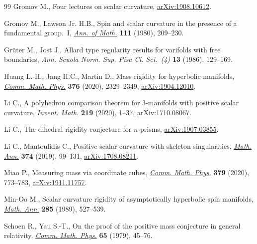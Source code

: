 \documentclass[10pt,a4paper]{amsart}
\numberwithin{equation}{section}
\theoremstyle{definition}
\begin{document}
\begin{thebibliography}{99}
Gromov M., Four lectures on scalar curvature, \href{https://arxiv.org/abs/1908.10612}{arXiv:1908.10612}.

Gromov M., Lawson Jr. H.B., Spin and scalar curvature in the presence of a
 fundamental group.~{I}, \href{https://doi.org/10.2307/1971198}{\textit{Ann. of Math.}} \textbf{111} (1980), 209--230.

Gr\"uter M., Jost J., Allard type regularity results for varifolds with free
 boundaries, \textit{Ann. Scuola Norm. Sup. Pisa Cl. Sci.~(4)} \textbf{13}
 (1986), 129--169.

Huang L.-H., Jang H.C., Martin D., Mass rigidity for hyperbolic manifolds,
 \href{https://doi.org/10.1007/s00220-019-03623-0}{\textit{Comm. Math. Phys.}} \textbf{376} (2020), 2329--2349,
 \href{https://arxiv.org/abs/1904.12010}{arXiv:1904.12010}.

Li C., A polyhedron comparison theorem for 3-manifolds with positive scalar
 curvature, \href{https://doi.org/10.1007/s00222-019-00895-0}{\textit{Invent. Math.}} \textbf{219} (2020), 1--37,
 \href{https://arxiv.org/abs/1710.08067}{arXiv:1710.08067}.

Li C., The dihedral rigidity conjecture for $n$-prisms, \href{https://arxiv.org/abs/1907.03855}{arXiv:1907.03855}.

Li C., Mantoulidis C., Positive scalar curvature with skeleton singularities,
 \href{https://doi.org/10.1007/s00208-018-1753-1}{\textit{Math. Ann.}} \textbf{374} (2019), 99--131, \href{https://arxiv.org/abs/1708.08211}{arXiv:1708.08211}.

Miao P., Measuring mass via coordinate cubes, \href{https://doi.org/10.1007/s00220-020-03811-3}{\textit{Comm. Math. Phys.}}
 \textbf{379} (2020), 773--783, \href{https://arxiv.org/abs/1911.11757}{arXiv:1911.11757}.

Min-Oo M., Scalar curvature rigidity of asymptotically hyperbolic spin
 manifolds, \href{https://doi.org/10.1007/BF01452046}{\textit{Math. Ann.}} \textbf{285} (1989), 527--539.

Schoen R., Yau S.-T., On the proof of the positive mass conjecture in general
 relativity, \href{https://doi.org/10.1007/BF01940959}{\textit{Comm. Math. Phys.}} \textbf{65} (1979), 45--76.


\end{thebibliography}
\end{document}

